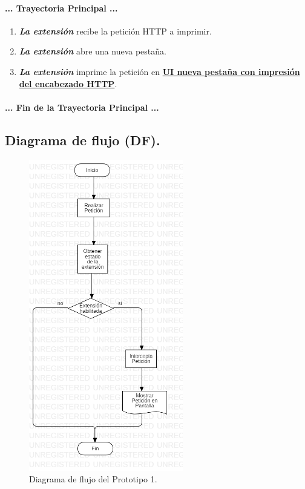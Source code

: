 \documentclass[12pt, a4paper, titlepage]{report}
\begin{document}
				\paragraph{... Trayectoria Principal ...}
				\begin{enumerate}
				    \item \textbf{\textit{La extensión}} recibe la petición HTTP a imprimir.
					\item \textbf{\textit{La extensión}} abre una nueva pestaña.
					\item \textbf{\textit{La extensión}} imprime la petición en \hyperref[UI_tabDatos_4.9]{\textbf{UI nueva pestaña con impresión del encabezado HTTP}}.
				\end{enumerate}
				\paragraph{... Fin de la Trayectoria Principal ...}

		
		    \subsection{Diagrama de flujo (DF).}
    			\begin{figure}[H]
    			    \begin{center} \includegraphics[width=0.6\textwidth]{imagenes/Desarrollo/Prototipo_1/DF_P1.png}
    			        \caption{Diagrama de flujo del Prototipo 1.}
    				\end{center}
    			\end{figure}
\end{document}
